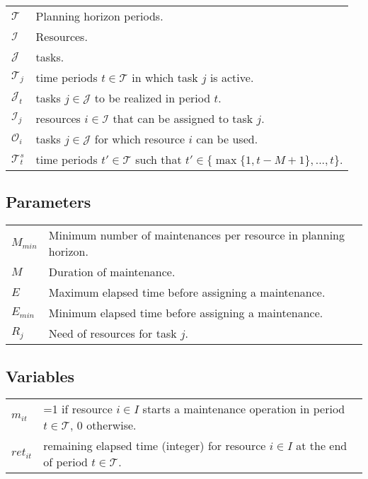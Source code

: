 \documentclass[a4paper,11pt]{article}
\begin{document}
    \begin{tabular}{ll}
        $\mathcal{T}$ & Planning horizon periods. \\
        $\mathcal{I}$ & Resources. \\
        $\mathcal{J}$ & tasks.  \\
        $\mathcal{T}_j$ &  time periods $t \in \mathcal{T}$ in which task $j$ is active. \\
        $\mathcal{J}_t $    &  tasks $j \in \mathcal{J}$ to be realized in period $t$. \\
        $\mathcal{I}_j$     &  resources $i \in \mathcal{I}$ that can be assigned to task $j$. \\
        $\mathcal{O}_i$     &  tasks $j \in \mathcal{J}$ for which resource $i$ can be used. \\
        $\mathcal{T}^{s}_t$ &  time periods $t' \in \mathcal{T}$ such that $t' \in \{ \max{\{1, t - M+1\}},  ..., {t}$\}. \\
    \end{tabular}

    \subsection{Parameters}

    \begin{tabular}{ll}
        $M_{min}$ & Minimum number of maintenances per resource in planning horizon. \\
        $M$ & Duration of maintenance. \\
        $E$ & Maximum elapsed time before assigning a maintenance. \\
        $E_{min}$ & Minimum elapsed time before assigning a maintenance. \\
        $R_{j}$ & Need of resources for task $j$. \\
    \end{tabular}


    \vskip 0.3cm

     \subsection{Variables}

        \begin{tabular}{ll}
            $m_{it}$    &  =1 if resource $i \in I$ starts a maintenance operation in period $t \in \mathcal{T}$, 0 otherwise. \\
            $ret_{it}$  &  remaining elapsed time (integer) for resource $i \in I$ at the end of period $t \in \mathcal{T}$. \\  
        \end{tabular}
\end{document}
